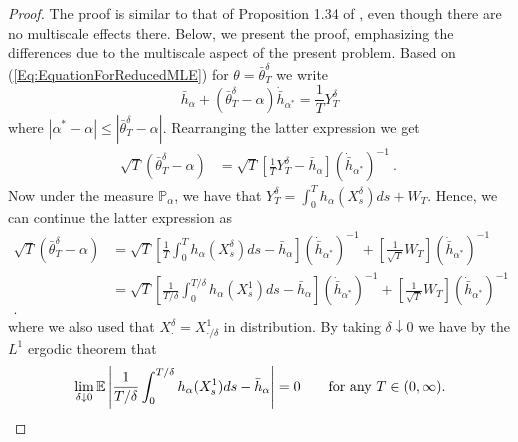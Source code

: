 \documentclass{article}
\begin{document}
\begin{proof} The proof is similar to that of Proposition 1.34 of \cite{Kutoyants}, even though there are no multiscale effects there. Below, we present the proof, emphasizing the differences due to the multiscale aspect of the present problem. %
Based on (\ref{Eq:EquationForReducedMLE}) for $\theta=\bar{\theta}^{\delta}_{T}$ we write
\[
\bar{h}_{\alpha}+\left(\bar{\theta}^{\delta}_{T}-\alpha\right)\dot{\bar{h}}_{\alpha^{*}}=\frac{1}{T}Y^{\delta}_{T}
\]
where $|\alpha^{*}-\alpha|\leq |\bar{\theta}^{\delta}_{T}-\alpha|$. Rearranging the latter expression we get
\begin{align}
\sqrt{T}\left(\bar{\theta}^{\delta}_{T}-\alpha\right)&=\sqrt{T}\left[\frac{1}{T}Y^{\delta}_{T}-\bar{h}_{\alpha}\right]\left(\dot{\bar{h}}_{\alpha^{*}}\right)^{-1} \nonumber\ .\
\end{align}
Now under the measure  $\mathbb{P}_{\alpha}$, we have that $Y^{\delta}_{T}=\int_{0}^{T}h_{\alpha}(X^{\delta}_{s})ds+W_{T}$. Hence, we can continue the latter expression as
\begin{align}
\sqrt{T}\left(\bar{\theta}^{\delta}_{T}-\alpha\right)
&=\sqrt{T}\left[\frac{1}{T}\int_{0}^{T}h_{\alpha}(X^{\delta}_{s})ds-\bar{h}_{\alpha}\right]\left(\dot{\bar{h}}_{\alpha^{*}}\right)^{-1} + \left[\frac{1}{\sqrt{T}}W_{T}\right]\left(\dot{\bar{h}}_{\alpha^{*}}\right)^{-1} \nonumber\\
&=\sqrt{T}\left[\frac{1}{T/\delta}\int_{0}^{T/\delta}h_{\alpha}(X^{1}_{s})ds-\bar{h}_{\alpha}\right]\left(\dot{\bar{h}}_{\alpha^{*}}\right)^{-1} + \left[\frac{1}{\sqrt{T}}W_{T}\right]\left(\dot{\bar{h}}_{\alpha^{*}}\right)^{-1} \nonumber\\
.\label{Eq:CLT_reduced1}
\end{align}
where we also used that $X^{\delta}_{\cdot}=X^{1}_{\cdot/\delta}$ in distribution. By taking $\delta\downarrow 0$ we have by the $L^{1}$ ergodic theorem  that
\[
\lim_{\delta\downarrow 0}\mathbb{E}\left|\frac{1}{T/\delta}\int_{0}^{T/\delta}h_{\alpha}(X^{1}_{s})ds-\bar{h}_{\alpha}\right|=0\qquad\hbox{for any $T\in(0,\infty)$.}
\]


\end{proof}
\end{document}
